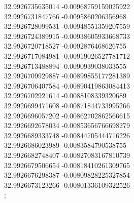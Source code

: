 {32.9926735635014	-0.00968759159025922\\
32.9926731847766	-0.0095860206356968\\
32.9926728099531	-0.00948551359207559\\
32.9926724389915	-0.00938605933668733\\
32.9926720718527	-0.0092876468626755\\
32.9926717084981	-0.00919026527781712\\
32.9926713488894	-0.0090939038033555\\
32.9926709929887	-0.00899855177281389\\
32.9926706407584	-0.00890419863084413\\
32.9926702921614	-0.0088108339320689\\
32.9926699471608	-0.00871844733995266\\
32.9926696057202	-0.00862702862566615\\
32.9926692678034	-0.00853656766698279\\
32.9926689333748	-0.00844705444716226\\
32.9926686023989	-0.0083584790538755\\
32.9926682748407	-0.00827083167810739\\
32.9926679506654	-0.00818410261309765\\
32.9926676298387	-0.00809828225327854\\
32.9926673123266	-0.00801336109322526\\
};
